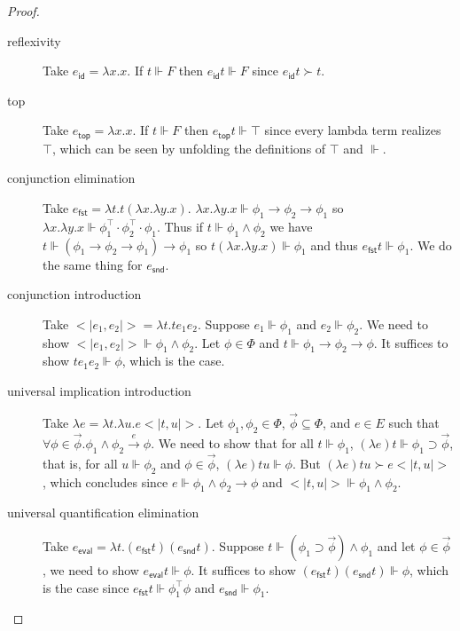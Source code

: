 \documentclass{article}
\newcommand{\realizes}{\Vdash}
\newcommand{\eid}{e_\mathsf{id}}
\newcommand{\etop}{e_\mathsf{top}}
\newcommand{\econj}[2]{<|#1, #2|>}
\newcommand{\efst}{e_\mathsf{fst}}
\newcommand{\esnd}{e_\mathsf{snd}}
\newcommand{\eeval}{e_\mathsf{eval}}
\newcommand{\elambda}[1]{\lambda #1}
\begin{document}
\begin{proof}
    \
    \begin{description}
        \item[reflexivity] Take $\eid = \lambda x. x$. If $t \realizes F$ then $\eid t \realizes F$ since $\eid t \succ t$.
        \item[top] Take $\etop = \lambda x. x$. If $t \realizes F$ then $\etop t \realizes \top$ since every lambda term realizes $\top$, which can be seen by unfolding the definitions of $\top$ and $\realizes$.
        \item[conjunction elimination] Take $\efst = \lambda t. t (\lambda x. \lambda y. x)$.
        $\lambda x. \lambda y. x \realizes \phi_1 \rightarrow \phi_2 \rightarrow \phi_1$ so $\lambda x. \lambda y. x \realizes \phi_1^\top \cdot \phi_2^\top \cdot \phi_1$.
        Thus if $t \realizes \phi_1 \wedge \phi_2$ we have $t \realizes (\phi_1 \rightarrow \phi_2 \rightarrow \phi_1) \rightarrow \phi_1$ so $t (\lambda x. \lambda y. x) \realizes \phi_1$ and thus $\efst t \realizes \phi_1$.
        We do the same thing for $\esnd$.
        \item[conjunction introduction] Take $\econj{e_1}{e_2} = \lambda t. t e_1 e_2$.
        Suppose $e_1 \realizes \phi_1$ and $e_2 \realizes \phi_2$.
        We need to show $\econj{e_1}{e_2} \realizes \phi_1 \wedge \phi_2$.
        Let $\phi \in \Phi$ and $t \realizes \phi_1 \rightarrow \phi_2 \rightarrow \phi$.
        It suffices to show $t e_1 e_2 \realizes \phi$, which is the case.
        \item[universal implication introduction] Take $\lambda{e} = \lambda t. \lambda u. e \econj{t}{u}$.
        Let $\phi_1, \phi_2 \in \Phi$, $\vec\phi \subseteq \Phi$, and $e \in E$ such that $\forall \phi \in \vec\phi. \phi_1 \wedge \phi_2 \xrightarrow{e} \phi$.
        We need to show that for all $t \realizes \phi_1$, $(\elambda{e}) t \realizes \phi_1 \supset \vec\phi$, that is, for all $u \realizes \phi_2$ and $\phi \in \vec\phi$, $(\elambda{e}) t u \realizes \phi$.
        But $(\elambda{e}) t u \succ e \econj{t}{u}$, which concludes since $e \realizes \phi_1 \wedge \phi_2 \rightarrow \phi$ and $\econj{t}{u} \realizes \phi_1 \wedge \phi_2$.
        \item[universal quantification elimination] Take $\eeval = \lambda t. (\efst t) (\esnd t)$.
        Suppose $t \realizes (\phi_1 \supset \vec\phi) \wedge \phi_1$ and let $\phi \in \vec\phi$, we need to show $\eeval t \realizes \phi$.
        It suffices to show $(\efst t) (\esnd t) \realizes \phi$, which is the case since $\efst t \realizes \phi_1^\top \phi$ and $\esnd \realizes \phi_1$.
    \end{description}
\end{proof}
\end{document}
